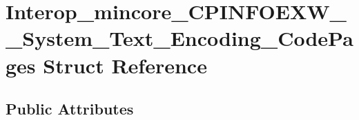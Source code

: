 \hypertarget{struct_interop__mincore___c_p_i_n_f_o_e_x_w_____system___text___encoding___code_pages}{}\section{Interop\+\_\+mincore\+\_\+\+C\+P\+I\+N\+F\+O\+E\+X\+W\+\_\+\+\_\+\+System\+\_\+\+Text\+\_\+\+Encoding\+\_\+\+Code\+Pages Struct Reference}
\label{struct_interop__mincore___c_p_i_n_f_o_e_x_w_____system___text___encoding___code_pages}
\subsection*{Public Attributes}
